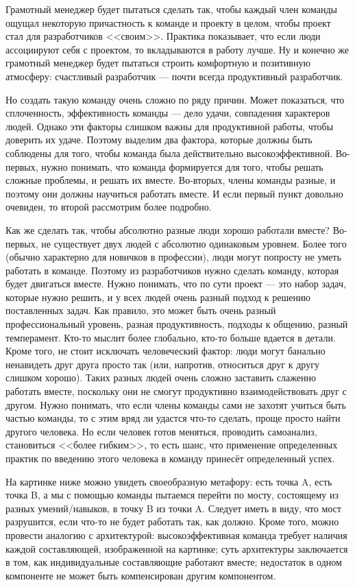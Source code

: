 \documentclass{../../text-style}
\begin{document}
Грамотный менеджер будет пытаться сделать так, чтобы каждый член команды ощущал некоторую причастность к команде и проекту в целом, чтобы проект стал для разработчиков <<своим>>. Практика показывает, что если люди ассоциируют себя с проектом, то вкладываются в работу лучше. Ну и конечно же грамотный менеджер будет пытаться строить комфортную и позитивную атмосферу: счастливый разработчик --- почти всегда продуктивный разработчик.

Но создать такую команду очень сложно по ряду причин. Может показаться, что сплоченность, эффективность команды --- дело удачи, совпадения характеров людей. Однако эти факторы слишком важны для продуктивной работы, чтобы доверить их удаче. Поэтому выделим два фактора, которые должны быть соблюдены для того, чтобы команда была действительно высокоэффективной. Во-первых, нужно понимать, что команда формируется для того, чтобы решать сложные проблемы, и решать их вместе. Во-вторых, члены команды разные, и поэтому они должны научиться работать вместе. И если первый пункт довольно очевиден, то второй рассмотрим более подробно.

Как же сделать так, чтобы абсолютно разные люди хорошо работали вместе? Во-первых, не существует двух людей с абсолютно одинаковым уровнем. Более того (обычно характерно для новичков в профессии), люди могут попросту не уметь работать в команде. Поэтому из разработчиков нужно сделать команду, которая будет двигаться вместе. Нужно понимать, что по сути проект --- это набор задач, которые нужно решить, и у всех людей очень разный подход к решению поставленных задач. Как правило, это может быть очень разный профессиональный уровень, разная продуктивность, подходы к общению, разный темперамент. Кто-то мыслит более глобально, кто-то больше вдается в детали. Кроме того, не стоит исключать человеческий фактор: люди могут банально ненавидеть друг друга просто так (или, напротив, относиться друг к другу слишком хорошо). Таких разных людей очень сложно заставить слаженно работать вместе, поскольку они не смогут продуктивно взаимодействовать друг с другом. Нужно понимать, что если члены команды сами не захотят учиться быть частью команды, то с этим вряд ли удастся что-то сделать, проще просто найти другого человека. Но если человек готов меняться, проводить самоанализ, становиться <<более гибким>>, то есть шанс, что применение определенных практик по введению этого человека в команду принесёт определенный успех.

На картинке ниже можно увидеть своеобразную метафору: есть точка A, есть точка B, а мы с помощью команды пытаемся перейти по мосту, состоящему из разных умений/навыков, в точку B из точки A. Следует иметь в виду, что мост разрушится, если что-то не будет работать так, как должно. Кроме того, можно провести аналогию с архитектурой: высокоэффективная команда требует наличия каждой составляющей, изображенной на картинке; суть архитектуры заключается в том, как индивидуальные составляющие работают вместе; недостаток в одном компоненте не может быть компенсирован другим компонентом.
\end{document}
